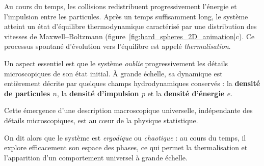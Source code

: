 \smallskip

Au cours du temps, les collisions redistribuent progressivement l’énergie et
l’impulsion entre les particules. Après un temps suffisamment long, le système
atteint un état d’équilibre thermodynamique caractérisé par une distribution
des vitesses de Maxwell--Boltzmann
(figure~\ref{fig:hard_spheres_2D_animation}c). Ce processus spontané
d’évolution vers l’équilibre est appelé \emph{thermalisation}.

\smallskip

Un aspect essentiel est que le système \emph{oublie} progressivement les
détails microscopiques de son état initial. À grande échelle, sa dynamique est
entièrement décrite par quelques champs hydrodynamiques conservés : la
\textbf{densité de particules $n$}, la \textbf{densité d’impulsion $p$} et la
\textbf{densité d’énergie $e$}.

Cette émergence d’une description macroscopique universelle, indépendante des
détails microscopiques, est au cœur de la physique statistique.

\smallskip

On dit alors que le système est \emph{\textsf{ergodique}} ou
\emph{\textsf{chaotique}} : au cours du temps, il explore efficacement son
espace des phases, ce qui permet la thermalisation et l’apparition d’un
comportement universel à grande échelle.

